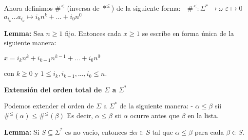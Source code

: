 \documentclass{article}
\begin{document}
\begin{flushleft}
Ahora definimos $\#^{\leq}$ (inversa de $*^{\leq}$) de la siguiente forma:\linebreak
\hspace*{7ex} - $\#^{\leq}: \Sigma^* \rightarrow \omega$\linebreak
\hspace*{16ex} $\varepsilon \mapsto 0$\linebreak
\hspace*{9ex} $a_{i_k}...a_{i_o} \mapsto i_kn^k + ... + i_0n^0$\linebreak

\textbf{Lemma:} Sea $n \geq 1$ fijo. Entonces cada $x \geq 1$ se escribe en forma única de la siguiente manera:
\begin{center}
    $x = i_kn^k + i_{k-1}n^{k-1} + ... + i_0n^0$
\end{center}
con $k \geq 0 $ y $1 \leq i_k, i_{k-1}, ..., i_0 \leq n$.\pagebreak

\begin{Large}\textbf{Extensión del orden total de $\Sigma$ a $\Sigma^*$}\end{Large}\linebreak

Podemos extender el orden de $\Sigma$ a $\Sigma^*$ de la siguiente manera:\linebreak
\hspace*{7ex} - $\alpha \leq \beta$ sii $\#^{\leq}(\alpha) \leq \#^{\leq}(\beta)$\linebreak
Es decir, $\alpha \leq \beta$ sii $\alpha$ ocurre antes que $\beta$ en la lista.\linebreak

\textbf{Lemma:} Si $S \subseteq \Sigma^*$ es no vacio, entonces $\exists \alpha \in S$ tal que $\alpha \leq \beta$ para cada $\beta \in S$.

\end{flushleft}
\end{document}
